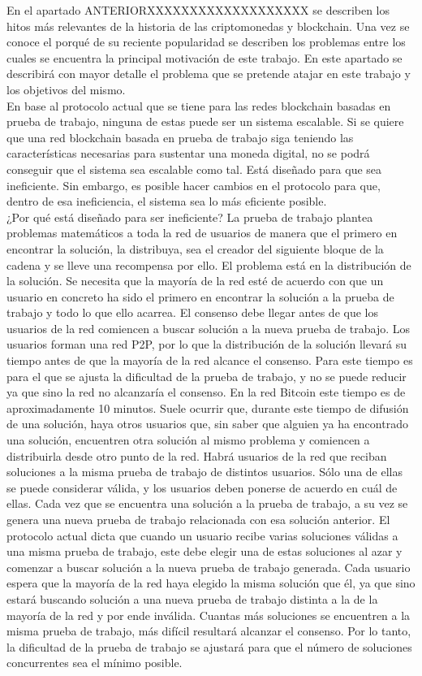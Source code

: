 En el apartado ANTERIORXXXXXXXXXXXXXXXXXXX se describen los hitos más relevantes de la historia de las criptomonedas y blockchain. Una vez se conoce el porqué de su reciente popularidad se describen los problemas entre los cuales se encuentra la principal motivación de este trabajo. En este apartado se describirá con mayor detalle el problema que se pretende atajar en este trabajo y los objetivos del mismo. \\
En base al protocolo actual que se tiene para las redes blockchain basadas en prueba de trabajo, ninguna de estas puede ser un sistema escalable. Si se quiere que una red blockchain basada en prueba de trabajo siga teniendo las características necesarias para sustentar una moneda digital, no se podrá conseguir que el sistema sea escalable como tal. Está diseñado para que sea ineficiente. Sin embargo, es posible hacer cambios en el protocolo para que, dentro de esa ineficiencia, el sistema sea lo más eficiente posible. \\
¿Por qué está diseñado para ser ineficiente? La prueba de trabajo plantea problemas matemáticos a toda la red de usuarios de manera que el primero en encontrar la solución, la distribuya, sea el creador del siguiente bloque de la cadena y se lleve una recompensa por ello. El problema está en la distribución de la solución. Se necesita que la mayoría de la red esté de acuerdo con que un usuario en concreto ha sido el primero en encontrar la solución a la prueba de trabajo y todo lo que ello acarrea. El consenso debe llegar antes de que los usuarios de la red comiencen a buscar solución a la nueva prueba de trabajo. Los usuarios forman una red P2P, por lo que la distribución de la solución llevará su tiempo antes de que la mayoría de la red alcance el consenso. Para este tiempo es para el que se ajusta la dificultad de la prueba de trabajo, y no se puede reducir ya que sino la red no alcanzaría el consenso. En la red Bitcoin este tiempo es de aproximadamente 10 minutos. Suele ocurrir que, durante este tiempo de difusión de una solución, haya otros usuarios que, sin saber que alguien ya ha encontrado una solución, encuentren otra solución al mismo problema y comiencen a distribuirla desde otro punto de la red. Habrá usuarios de la red que reciban soluciones a la misma prueba de trabajo de distintos usuarios. Sólo una de ellas se puede considerar válida, y los usuarios deben ponerse de acuerdo en cuál de ellas. Cada vez que se encuentra una solución a la prueba de trabajo, a su vez se genera una nueva prueba de trabajo relacionada con esa solución anterior. El protocolo actual dicta que cuando un usuario recibe varias soluciones válidas a una misma prueba de trabajo, este debe elegir una de estas soluciones al azar y comenzar a buscar solución a la nueva prueba de trabajo generada. Cada usuario espera que la mayoría de la red haya elegido la misma solución que él, ya que sino estará buscando solución a una nueva prueba de trabajo distinta a la de la mayoría de la red y por ende inválida. Cuantas más soluciones se encuentren a la misma prueba de trabajo, más difícil resultará alcanzar el consenso. Por lo tanto, la dificultad de la prueba de trabajo se ajustará para que el número de soluciones concurrentes sea el mínimo posible.
